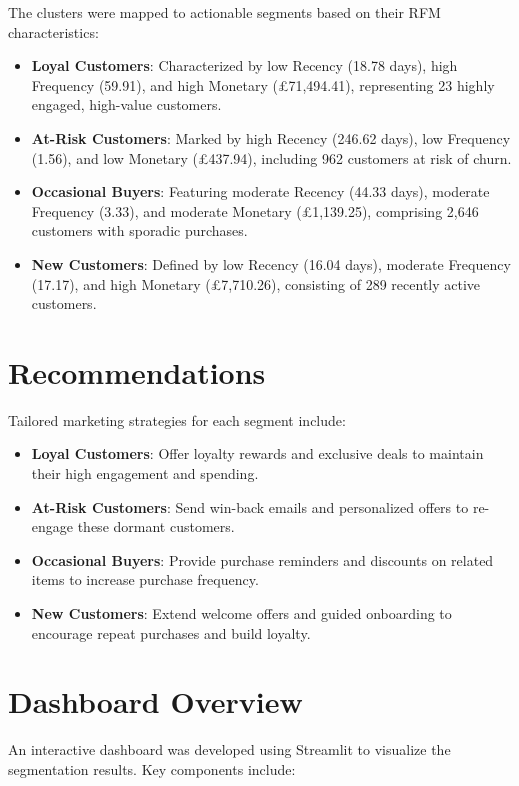 \documentclass[a4paper,12pt]{article}
\begin{document}
The clusters were mapped to actionable segments based on their RFM characteristics:
\begin{itemize}
    \item \textbf{Loyal Customers}: Characterized by low Recency (18.78 days), high Frequency (59.91), and high Monetary (£71,494.41), representing 23 highly engaged, high-value customers.
    \item \textbf{At-Risk Customers}: Marked by high Recency (246.62 days), low Frequency (1.56), and low Monetary (£437.94), including 962 customers at risk of churn.
    \item \textbf{Occasional Buyers}: Featuring moderate Recency (44.33 days), moderate Frequency (3.33), and moderate Monetary (£1,139.25), comprising 2,646 customers with sporadic purchases.
    \item \textbf{New Customers}: Defined by low Recency (16.04 days), moderate Frequency (17.17), and high Monetary (£7,710.26), consisting of 289 recently active customers.
\end{itemize}

\section{Recommendations}

Tailored marketing strategies for each segment include:
\begin{itemize}
    \item \textbf{Loyal Customers}: Offer loyalty rewards and exclusive deals to maintain their high engagement and spending.
    \item \textbf{At-Risk Customers}: Send win-back emails and personalized offers to re-engage these dormant customers.
    \item \textbf{Occasional Buyers}: Provide purchase reminders and discounts on related items to increase purchase frequency.
    \item \textbf{New Customers}: Extend welcome offers and guided onboarding to encourage repeat purchases and build loyalty.
\end{itemize}

\section{Dashboard Overview}

An interactive dashboard was developed using Streamlit to visualize the segmentation results. Key components include:
\end{document}
